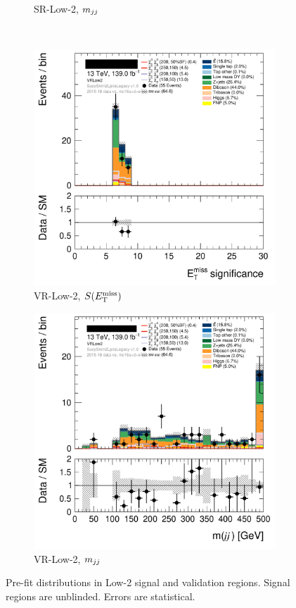 \begin{figure}[tp]
\begin{subfigure}{0.495\textwidth}
\caption{SR-Low-2, $m_{jj}$}
\end{subfigure}
\\[0.5em]
\begin{subfigure}{0.495\textwidth}
\centering
\includegraphics[width=\textwidth]{figures/2ljets_def_met_Sign_VRLow2.png}
\caption{VR-Low-2, $S(E_\mathrm{T}^\mathrm{miss})$}
\end{subfigure}
\hfill
\begin{subfigure}{0.495\textwidth}
\centering
\includegraphics[width=\textwidth]{figures/2ljets_def_mjj_VRLow2.png}
\caption{VR-Low-2, $m_{jj}$}
\end{subfigure}
\caption[
Pre-fit distributions in Low-2 signal and validation regions
]{%
Pre-fit distributions in Low-2 signal and validation regions.
Signal regions are unblinded.
Errors are statistical.
}
\label{fig:2ljets_low2_region}
\end{figure}

